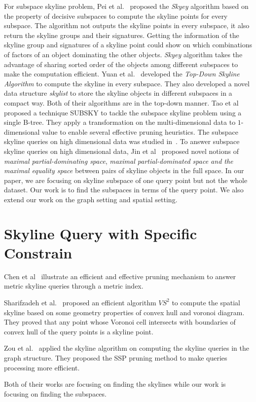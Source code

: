 For subspace skyline problem, Pei et al.~\cite{pei2005catching} proposed the \emph{Skyey} algorithm based on the property of decisive subspaces to compute the skyline points for every subspace.  The algorithm not outputs the skyline points in every subspace, it also return the skyline groups and their signatures.
Getting the information of the skyline group and signatures of a skyline point could show on which combinations of factors of an object dominating the other objects.
\emph{Skyey} algorithm takes the advantage of sharing sorted order of the objects among different subspaces to make the computation efficient. Yuan et al.~\cite{yuan2005efficient} developed the \emph{Top-Down Skyline Algorithm} to compute the skyline in every subspace. They also developed a novel data structure \emph{skylist} to store the skyline objects in different subspaces in a compact way. 
Both of their algorithms are in the top-down manner. 
Tao et al~\cite{tao2006subsky} proposed a technique SUBSKY to tackle the subspace skyline problem using a single B-tree. They apply a transformation on the multi-dimensional data to $1$-dimensional value to enable several effective pruning heuristics.
The subspace skyline queries on high dimensional data was studied in~\cite{jin2007efficient}. To answer subspace skyline queries on high dimensional data, Jin et al~\cite{jin2007efficient} proposed novel notions of \emph{maximal partial-dominating space}, \emph{maximal partial-dominated space and the maximal equality space} between pairs of skyline objects in the full space. In our paper, we are focusing on skyline subspace of one query point but not the whole dataset. Our work is to find the subspaces in terms of the query point. We also extend our work on the graph setting and spatial setting.

\section{Skyline Query with Specific Constrain}
\label{sec:rel:constrain}

Chen et al~\cite{chen2008dynamic} illustrate an efficient and effective pruning mechanism to answer metric skyline queries through a metric index.

Sharifzadeh et al.~\cite{sharifzadeh2006spatial} proposed an efficient algorithm $VS^2$ to compute the spatial skyline based on some geometry properties of convex hull and voronoi diagram. They proved that any point whose Voronoi cell intersects with boundaries of convex hull of the query points is a skyline point.

Zou et al.~\cite{zou2010dynamic} applied the skyline algorithm on computing the skyline queries in the graph structure. They proposed the SSP pruning method to make queries processing more efficient.

Both of their works are focusing on finding the skylines while our work is focusing on finding the subspaces.




